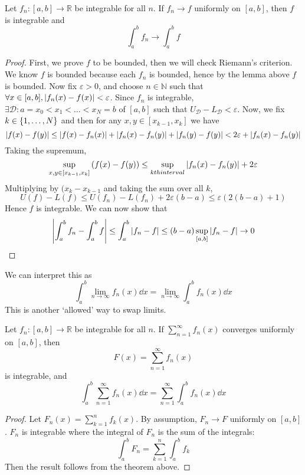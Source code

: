 \begin{theorem}
	Let \( f_n \colon [a,b] \to \mathbb R \) be integrable for all \( n \).
	If \( f_n \to f \) uniformly on \( [a,b] \), then \( f \) is integrable and
	\[
		\int_a^b f_n \to \int_a^b f
	\]
\end{theorem}
\begin{proof}
	First, we prove \( f \) to be bounded, then we will check Riemann's criterion.
	We know \( f \) is bounded because each \( f_n \) is bounded, hence by the lemma above \( f \) is bounded.
	Now fix \( \varepsilon > 0 \), and choose \( n \in \mathbb N \) such that \( \forall x \in [a,b], \abs{f_n(x) - f(x)} < \varepsilon \).
	Since \( f_n \) is integrable, \( \exists \mathcal D \colon a = x_0 < x_1 < \dots < x_N = b \) of \( [a,b] \) such that \( U_{\mathcal D} - L_{\mathcal D} < \varepsilon \).
	Now, we fix \( k \in \qty{1,\dots,N} \) and then for any \( x,y \in [x_{k-1}, x_k] \) we have
	\[
		\abs{f(x) - f(y)} \leq \abs{f(x) - f_n(x)} + \abs{f_n(x) - f_n(y)} + \abs{f_n(y) - f(y)} < 2\varepsilon + \abs{f_n(x) - f_n(y)}
	\]
	Taking the supremum,
	\[
		\sup_{x,y \in [x_{k-1},x_k]} \qty(f(x) - f(y)) \leq \sup_{kth interval} \abs{f_n(x) - f_n(y)} + 2\varepsilon
	\]
	Multiplying by \( (x_k - x_{k-1} \) and taking the sum over all \( k \),
	\[
		U(f) - L(f) \leq U(f_n) - L(f_n) + 2\varepsilon (b-a) \leq \varepsilon (2(b-a) + 1)
	\]
	Hence \( f \) is integrable.
	We can now show that
	\[
		\abs{\int_a^b f_n - \int_a^b f} \leq \int_a^b \abs{f_n - f} \leq (b-a) \sup_{[a,b]} \abs{f_n - f} \to 0
	\]
\end{proof}
We can interpret this as
\[
	\int_a^b \lim_{n \to \infty} f_n(x) \dd{x} = \lim_{n \to \infty} \int_a^b f_n(x) \dd{x}
\]
This is another `allowed' way to swap limits.

\begin{corollary}
	Let \( f_n \colon [a,b] \to \mathbb R \) be integrable for all \( n \).
	If \( \sum_{n=1}^\infty f_n(x) \) converges uniformly on \( [a,b] \), then
	\[
		F(x) = \sum_{n=1}^\infty f_n(x)
	\]
	is integrable, and
	\[
		\int_a^b \sum_{n=1}^\infty f_n(x) \dd{x} = \sum_{n=1}^\infty \int_a^b f_n(x) \dd{x}
	\]
\end{corollary}
\begin{proof}
	Let \( F_n(x) = \sum_{k=1}^n f_k(x) \).
	By assumption, \( F_n \to F \) uniformly on \( [a,b] \).
	\( F_n \) is integrable where the integral of \( F_n \) is the sum of the integrals:
	\[
		\int_a^b F_n = \sum_{k=1}^n \int_a^b f_k
	\]
	Then the result follows from the theorem above.
\end{proof}


